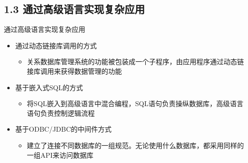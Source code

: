 \subsection{1.3 通过高级语言实现复杂应用}

\begin{frame}{通过高级语言实现复杂应用}
    \begin{itemize}
        \item 通过动态链接库调用的方式
        \begin{itemize}
            \item 关系数据库管理系统的功能被包装成一个子程序，由应用程序通过动态链接库调用来获得数据管理的功能
        \end{itemize}
        \item 基于嵌入式SQL的方式
        \begin{itemize}
            \item 将SQL嵌入到高级语言中混合编程，SQL语句负责操纵数据库，高级语言语句负责控制逻辑流程
        \end{itemize}
        \item 基于ODBC/JDBC的中间件方式
        \begin{itemize}
            \item 建立了连接不同数据库的一组规范。无论使用什么数据库，都采用同样的一组API来访问数据库
        \end{itemize}
    \end{itemize}
\end{frame}







